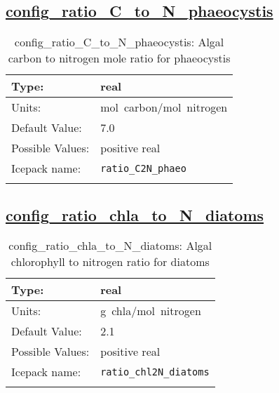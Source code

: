 \subsection[config\_ratio\_C\_to\_N\_phaeocystis]{\hyperref[sec:nm_tab_biogeochemistry]{config\_ratio\_C\_to\_N\_phaeocystis}}
\label{subsec:nm_sec_config_ratio_C_to_N_phaeocystis}
\begin{center}
\begin{longtable}{| p{2.0in} || p{4.0in} |}
    \hline
    Type: & real \\
    \hline
    Units: & \si{mol.carbon/mol.nitrogen} \\
    \hline
    Default Value: & 7.0 \\
    \hline
    Possible Values: & positive real \\
    \hline
    Icepack name: & \verb+ratio_C2N_phaeo+ \\
    \hline
    \caption{config\_ratio\_C\_to\_N\_phaeocystis: Algal carbon to nitrogen mole ratio for phaeocystis}
\end{longtable}
\end{center}
\subsection[config\_ratio\_chla\_to\_N\_diatoms]{\hyperref[sec:nm_tab_biogeochemistry]{config\_ratio\_chla\_to\_N\_diatoms}}
\label{subsec:nm_sec_config_ratio_chla_to_N_diatoms}
\begin{center}
\begin{longtable}{| p{2.0in} || p{4.0in} |}
    \hline
    Type: & real \\
    \hline
    Units: & \si{g.chla/mol.nitrogen} \\
    \hline
    Default Value: & 2.1 \\
    \hline
    Possible Values: & positive real \\
    \hline
    Icepack name: & \verb+ratio_chl2N_diatoms+ \\
    \hline
    \caption{config\_ratio\_chla\_to\_N\_diatoms: Algal chlorophyll to nitrogen ratio for diatoms}
\end{longtable}
\end{center}
